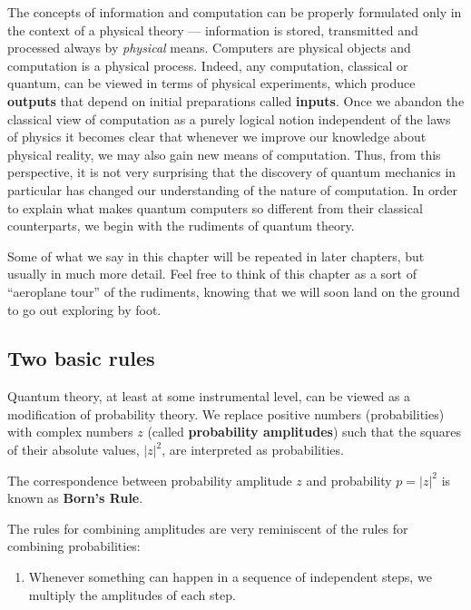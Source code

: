 \documentclass{article}
\providecommand{\tightlist}{%
  \setlength{\itemsep}{0pt}\setlength{\parskip}{0pt}}
\newenvironment{idea}%
{\bigskip\noindent\begin{minipage}{\textwidth}\smallskip\begin{tcolorbox}[colback=gray!10,boxrule=0.01mm]}%
{\end{tcolorbox}\end{minipage}\bigskip}
\begin{document}
The concepts of information and computation can be properly formulated only in the context of a physical theory --- information is stored, transmitted and processed always by \emph{physical} means.
Computers are physical objects and computation is a physical process.
Indeed, any computation, classical or quantum, can be viewed in terms of physical experiments, which produce \textbf{outputs} that depend on initial preparations called \textbf{inputs}.
Once we abandon the classical view of computation as a purely logical notion independent of the laws of physics it becomes clear that whenever we improve our knowledge about physical reality, we may also gain new means of computation.
Thus, from this perspective, it is not very surprising that the discovery of quantum mechanics in particular has changed our understanding of the nature of computation.
In order to explain what makes quantum computers so different from their classical counterparts, we begin with the rudiments of quantum theory.

Some of what we say in this chapter will be repeated in later chapters, but usually in much more detail.
Feel free to think of this chapter as a sort of ``aeroplane tour'' of the rudiments, knowing that we will soon land on the ground to go out exploring by foot.

\hypertarget{two-basic-rules}{%
\subsection{Two basic rules}\label{two-basic-rules}}

Quantum theory, at least at some instrumental level, can be viewed as a modification of probability theory.
We replace positive numbers (probabilities) with complex numbers \(z\) (called \textbf{probability amplitudes}) such that the squares of their absolute values, \(|z|^2\), are interpreted as probabilities.

\begin{idea}

The correspondence between probability amplitude \(z\) and probability \(p=|z|^2\) is known as \textbf{Born's Rule}.

\end{idea}

The rules for combining amplitudes are very reminiscent of the rules for combining probabilities:

\begin{enumerate}
\def\labelenumi{\arabic{enumi}.}
\tightlist
\item
  Whenever something can happen in a sequence of independent steps, we multiply the amplitudes of each step.
\end{enumerate}
\end{document}
